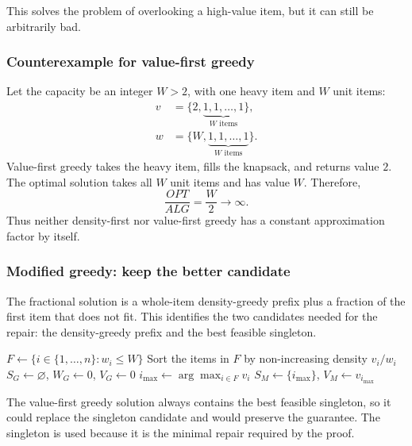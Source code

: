 \documentclass[10pt]{article}
\theoremstyle{definition}
\begin{document}
This solves the problem of overlooking a high-value item, but it can still be arbitrarily bad.
\subsubsection*{Counterexample for value-first greedy}
Let the capacity be an integer $W>2$, with one heavy item and $W$ unit items:
\begin{align*}
  v &= \{2, \underbrace{1,1,\ldots,1}_{W\text{ items}}\},\\
  w &= \{W, \underbrace{1,1,\ldots,1}_{W\text{ items}}\}.
\end{align*}
Value-first greedy takes the heavy item, fills the knapsack, and returns value $2$. The optimal solution takes all $W$ unit items and has value $W$. Therefore,
\[
  \frac{OPT}{ALG}=\frac{W}{2}\longrightarrow\infty.
\]
Thus neither density-first nor value-first greedy has a constant approximation factor by itself.

\subsubsection*{Modified greedy: keep the better candidate}
The fractional solution is a whole-item density-greedy prefix plus a fraction of the first item that does not fit. This identifies the two candidates needed for the repair: the density-greedy prefix and the best feasible singleton.


\begin{algorithm}[H]
  \caption{Modified two-candidate greedy for 0/1 knapsack}
  $F \gets \{i \in \{1,\ldots,n\}:w_i\leq W\}$\;
  Sort the items in $F$ by non-increasing density $v_i/w_i$\;
  $S_G \gets \varnothing$, $W_G \gets 0$, $V_G \gets 0$\;
  $i_{\max}\gets\arg\max_{i\in F}v_i$\;
  $S_M\gets\{i_{\max}\}$, $V_M\gets v_{i_{\max}}$\;
\end{algorithm}

The value-first greedy solution always contains the best feasible singleton, so it could replace the singleton candidate and would preserve the guarantee. The singleton is used because it is the minimal repair required by the proof.
\end{document}
